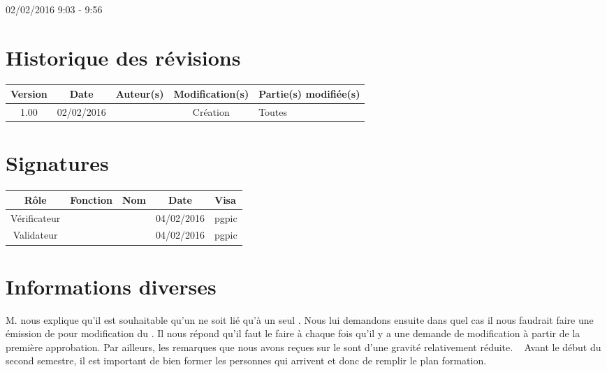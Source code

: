 \documentclass [a4paper] {article}
\begin{document}
\rhead{}

02/02/2016
\hfill   
\hfill 	9:03 - 9:56 				%



\section*{Historique des révisions}
\begin{center}
			\begin{tabular}{| c | c | c | c | p{4cm} |}
				\hline
				\rowcolor{Gray}
				Version & Date & Auteur(s) & Modification(s) & Partie(s) modifiée(s)		 \\
				\hline
				1.00 & 02/02/2016 & \Pierre & Création & Toutes \\
		\hline		
			\end{tabular}
		\end{center}

\section*{Signatures}

		\begin{center}
			\begin{tabular}{| c | c | c | c | p{4cm} |}
				\hline
				\rowcolor{Gray}
				Rôle & Fonction & Nom & Date & Visa		 \\
				\hline
				Vérificateur & \RQA & \Kafui & 04/02/2016 & pgpic \\[30pt]
				\hline
				Validateur & \CP & \Sergi & 04/02/2016 & pgpic \\[30pt]	
				\hline
			\end{tabular}
		\end{center}


\section{Informations diverses}
M. \nomTuteurQualite{} nous explique qu'il est souhaitable qu'un \OC{} ne soit lié qu'à un seul \FT{}. Nous lui demandons ensuite dans quel cas il nous faudrait faire une émission de \FFT{} pour modification du \PQ{}. Il nous répond qu'il faut le faire à chaque fois qu'il y a une demande de modification à partir de la première approbation. Par ailleurs, les remarques que nous avons reçues sur le \PQCourt{} sont d'une gravité relativement réduite.
~
Avant le début du second semestre, il est important de bien former les personnes qui arrivent et donc de remplir le plan formation.
\end{document}
